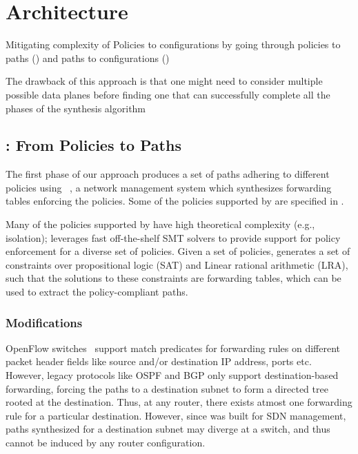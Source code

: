 \section{Architecture} \label{sec:architecture}
Mitigating complexity of Policies to configurations
by going through policies to paths (\genesis) and
paths to configurations (\name)

The drawback of this approach is that one might need to consider multiple possible
data planes before finding one that can successfully complete all the phases of the
synthesis algorithm

\subsection{\genesis: From Policies to Paths} \label{sec:genesis}
The first phase of our approach produces a set of paths adhering to
different policies using \genesis~\cite{genesis}, a network management
system which synthesizes forwarding tables enforcing the policies. 
Some of the policies supported by \genesis are specified in 
. 

Many of the policies supported by \genesis have high 
theoretical complexity (e.g., isolation); \genesis 
leverages fast off-the-shelf SMT solvers to provide
support for policy enforcement for a diverse set of policies.
Given a set of policies, \genesis generates a set of constraints 
over propositional logic (SAT) and Linear rational arithmetic (LRA),
such that the solutions to these constraints are forwarding
tables, which can be used to extract the 
policy-compliant paths.

\subsubsection{Modifications}
OpenFlow switches~\cite{openflow} support match predicates for
forwarding rules on different packet header fields like source
and/or destination IP address, ports etc. However, legacy protocols
like OSPF and BGP only support destination-based forwarding, 
forcing the paths to a destination subnet to 
form a directed tree rooted at the destination. 
Thus,
at any router, there exists atmost one forwarding rule for a 
particular destination. However, since \genesis was built for
SDN management, paths synthesized for a destination subnet may
diverge at a switch, and thus cannot be induced by any router
configuration. 

